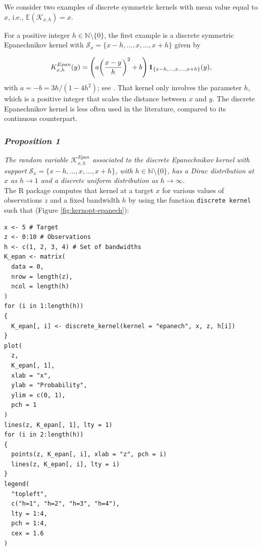 We consider two examples of discrete symmetric kernels with mean value equal to \(x\), i.e., \(\mathbb{E}(\mathcal{K}_{x,h}) =x\).

For a positive integer \(h\in\mathbb{N}\setminus\{0\}\), the first example is a discrete symmetric Epanechnikov kernel with \(\mathcal{S}_{x}=\{x-h,\ldots,x,\ldots,x+h\}\) given by

\begin{equation*}  
K^{Epan}_{x,h}(y)= \left(a\bigg(\frac{x-y}{h}\bigg)^{2} + b\right){\bf 1}_{\{x-h,\ldots,x,\ldots,x+h\}}(y),
\end{equation*}
with \(a=-b=3h/(1-4h^{2})\); see \citet{chu2017}. That kernel only involves the parameter \(h\), which is a positive integer that scales the distance between \(x\) and \(y\). The discrete Epanechnikov kernel is less often used in the literature, compared to its continuous counterpart.

\subsubsection{\texorpdfstring{\emph{Proposition 1}}{Proposition 1}}\label{proposition-1}

\emph{
The random variable \(\mathcal{K}^{Epan}_{x,h}\) associated to the discrete Epanechnikov kernel with support \(\mathcal{S}_{x}=\{x-h,\ldots,x,\ldots,x+h\}\), with \(h\in\mathbb{N}\setminus\{0\}\), has a Dirac distribution at \(x\) as \(h\to 1\) and a discrete uniform distribution as \(h\to \infty\).
}\\

The  R package computes that kernel at a target \(x\) for various values of observations \(z\) and a fixed bandwidth \(h\) by using the function \texttt{discrete\ kernel} such that (Figure \ref{fig:kernopt-epanech}):

\begin{verbatim}
x <- 5 # Target
z <- 0:10 # Observations
h <- c(1, 2, 3, 4) # Set of bandwidths
K_epan <- matrix(
  data = 0,
  nrow = length(z),
  ncol = length(h)
)
for (i in 1:length(h))
{
  K_epan[, i] <- discrete_kernel(kernel = "epanech", x, z, h[i])
}
plot(
  z,
  K_epan[, 1],
  xlab = "x",
  ylab = "Probability",
  ylim = c(0, 1),
  pch = 1
)
lines(z, K_epan[, 1], lty = 1)
for (i in 2:length(h))
{
  points(z, K_epan[, i], xlab = "z", pch = i)
  lines(z, K_epan[, i], lty = i)
}
legend(
  "topleft",
  c("h=1", "h=2", "h=3", "h=4"),
  lty = 1:4,
  pch = 1:4,
  cex = 1.6
)
\end{verbatim}

